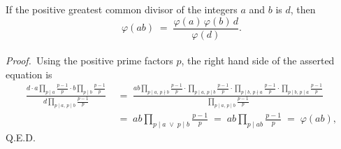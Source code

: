 \documentclass[12pt]{article}
\theoremstyle{definition}
\begin{document}
If the positive greatest common divisor of the integers $a$ and 
$b$ is $d$, then
$$\varphi(ab) \;=\; \frac{\varphi(a)\,\varphi(b)\,d}{\varphi(d)}.$$\\


\emph{Proof.}\, Using the positive prime factors $p$, the right hand side of the asserted equation is 
\begin{align*}
\frac{d\cdot a\prod_{p\mid a}\frac{p-1}{p}\cdot b\prod_{p\mid b}\frac{p-1}{p}}{d\prod_{p\mid a,\,p\mid b}\frac{p-1}{p}}
& \;=\; 
\frac{ab\prod_{p\mid a,\,p\nmid b}\frac{p-1}{p}\cdot\prod_{p\mid a,\,p\mid b}\frac{p-1}{p}\cdot\prod_{p\mid b,\,p\nmid a}\frac{p-1}{p}\cdot\prod_{p\mid b,\,p\mid a}\frac{p-1}{p}}{\prod_{p\mid a,\,p\mid b}\frac{p-1}{p}}\\
& \;=\; ab\prod_{p \mid a\;\lor\;p \mid b}\frac{p\!-\!1}{p} \;=\; ab\prod_{p \mid ab}\frac{p\!-\!1}{p}
\;=\; \varphi(ab),
\end{align*}
Q.E.D.
\end{document}
